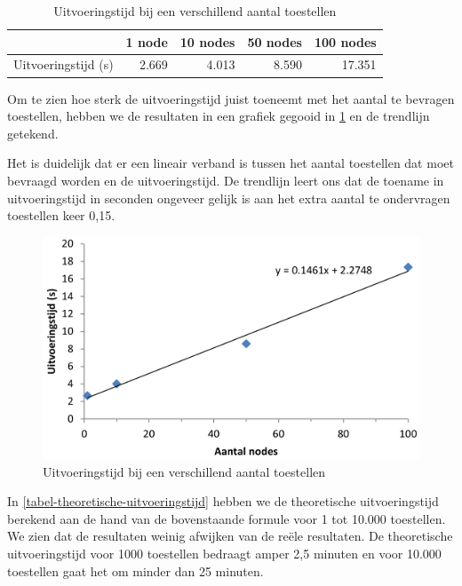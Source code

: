 \begin{table}[h]
\centering
\begin{tabular}{@{}lrrrr@{}}
\toprule
                    & 1 node & 10 nodes & 50 nodes & 100 nodes \\ \midrule
Uitvoeringstijd (s) & 2.669  & 4.013    & 8.590    & 17.351    \\ \bottomrule
\end{tabular}
\caption{Uitvoeringstijd bij een verschillend aantal toestellen}
\label{tabel-uitvoeringstijd-aantalnodes}
\end{table}

Om te zien hoe sterk de uitvoeringstijd juist toeneemt met het aantal te bevragen toestellen,
hebben we de resultaten in een grafiek gegooid in \cref{fig-uitvoeringstijd} en de trendlijn getekend.

Het is duidelijk dat er een lineair verband is tussen het aantal toestellen dat moet bevraagd worden en de uitvoeringstijd.
De trendlijn leert ons dat de toename in uitvoeringstijd in seconden ongeveer gelijk is aan het extra aantal te ondervragen toestellen keer 0,15.

\begin{figure}[h]
	\centering
	\includegraphics[scale=0.40]{figures/uitvoeringstijd}
	\caption{Uitvoeringstijd bij een verschillend aantal toestellen}
	\label{fig-uitvoeringstijd}
\end{figure}

In \cref{tabel-theoretische-uitvoeringstijd} hebben we de theoretische uitvoeringstijd berekend aan de hand van de bovenstaande formule voor 1 tot 10.000 toestellen.
We zien dat de resultaten weinig afwijken van de reële resultaten.
De theoretische uitvoeringstijd voor 1000 toestellen bedraagt amper 2,5 minuten en voor 10.000 toestellen gaat het om minder dan 25 minuten.


